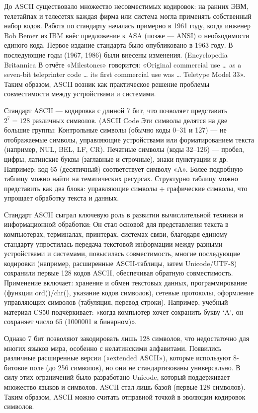 \documentclass{ou}
\begin{document}
До ASCII существовало множество несовместимых кодировок: на ранних ЭВМ, телетайпах и теле­сетях каждая фирма или система могла применять собственный набор кодов. Работа по стандарту началась примерно в 1961 году, когда инженер Bob Bemer из IBM внёс предложение к ASA (позже — ANSI) о необходимости единого кода. Первое издание стандарта было опубликовано в 1963 году. В последующие годы (1967, 1986) были внесены изменения. (Encyclopedia Britannica В отчёте «Milestones» говорится: «Original commercial use … as a seven-bit teleprinter code … its first commercial use was … Teletype Model 33». Таким образом, ASCII возник как практическое решение проблемы совместимости между устройствами и системами.

Стандарт ASCII — кодировка с длиной 7 бит, что позволяет представить $2^7 = 128$  различных символов. (ASCII Code Эти символы делятся на две большие группы: Контрольные символы (обычно коды 0--31 и 127) — не отображаемые символы, управляющие устройствами или форматированием текста (например, NUL, BEL, LF, CR).  Печатные символы (коды 32--126) — пробел, цифры, латинские буквы (заглавные и строчные), знаки пунктуации и др. Например: код 65 (десятичный) соответствует символу «A». Более подробную таблицу можно найти на тематических ресурсах. Структурно таблицу можно представить как два блока: управляющие символы + графические символы, что упрощает обработку текста и данных.

Стандарт ASCII сыграл ключевую роль в развитии вычислительной техники и информационной обработки: Он стал основой для представления текста в компьютерах, терминалах, принтерах, системах связи, благодаря единому стандарту упростилась передача текстовой информации между разными устройствами и системами, повысилась совместимость, многие последующие кодировки (например, расширенные ASCII-таблицы, затем Unicode/UTF-8) сохранили первые 128 кодов ASCII, обеспечивая обратную совместимость. Применение включает: хранение и обмен текстовых данных, программирование (функции ord()/chr(), указание кодов символов), сетевые протоколы, оформление управляющих символов (табуляция, перевод строки). Например, учебный материал CS50 подчёркивает: «когда компьютер хочет сохранить букву ‘A’, он сохраняет число 65 (1000001 в бинарном)». 

Однако 7 бит позволяют закодировать лишь 128 символов, что недостаточно для многих языков мира, особенно с нелатинскими алфавитами. Появились различные расширенные версии («extended ASCII»), которые используют 8-битовое поле (до 256 символов), но они не стандартизованы универсально. В силу этих ограничений было разработано Unicode, который поддерживает множество языков и символов. ASCII стал лишь базой (первые 128 символов). Таким образом, ASCII можно считать отправной точкой в эволюции кодировок символов.
\end{document}
